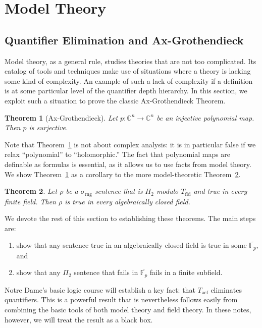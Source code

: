 \documentclass{article}
\theoremstyle{plain}
\newtheorem{thm}{Theorem}[section]
\theoremstyle{definition}
\newcommand{\ringsig}{\sigma_{\operatorname{rng}}}
\newcommand{\fieldthy}{T_{\operatorname{fld}}}
\newcommand{\acf}{T_{\operatorname{acf}}}
\begin{document}
\section{Model Theory}

\subsection{Quantifier Elimination and Ax-Grothendieck}

Model theory, as a general rule, studies theories that are not too
complicated. Its catalog of tools and techniques make use of
situations where a theory is lacking some kind of complexity. An
example of such a lack of complexity if a definition is at some
particular level of the quantifier depth hierarchy. In this section,
we exploit such a situation to prove the classic Ax-Grothendieck
Theorem.

\begin{thm}[Ax-Grothendieck]\label{thm:ax-groth}
  Let $p : \mathbb{C}^n \to \mathbb{C}^n$ be an injective polynomial
  map. Then $p$ is surjective.
\end{thm}

Note that Theorem~\ref{thm:ax-groth} is not about complex analysis: it
is in particular false if we relax ``polynomial'' to ``holomorphic.''
The fact that polynomial maps are definable as formulas is essential,
as it allows us to use facts from model theory. We show
Theorem~\ref{thm:ax-groth} as a corollary to the more model-theoretic
Theorem~\ref{thm:ax-groth-modeltheory}.

\begin{thm}\label{thm:ax-groth-modeltheory}
  Let $\rho$ be a $\ringsig$-sentence that is $\Pi_2$ modulo
  $\fieldthy$ and true in every finite field. Then $\rho$ is true in
  every algebraically closed field.
\end{thm}

We devote the rest of this section to establishing these theorems. The
main steps are:
\begin{enumerate}
\item show that any sentence true in an algebraically closed field is
  true in some $\overline{\mathbb{F}_p}$, and
\item show that any $\Pi_2$ sentence that fails in
  $\overline{\mathbb{F}_p}$ fails in a finite subfield.
\end{enumerate}

Notre Dame's basic logic course will establish a key fact: that $\acf$
eliminates quantifiers. This is a powerful result that is nevertheless
follows easily from combining the basic tools of both model theory and
field theory. In these notes, however, we will treat the result as a
black box.
\end{document}

